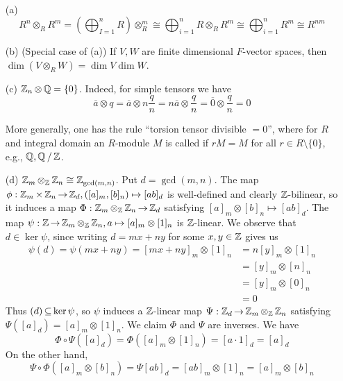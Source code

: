 \documentclass[11pt]{book}
\theoremstyle{definition}   \newtheorem{defn}[counter]{Definition} %
\newcommand{\ov}{\overline}   \newcommand{\wt}{\widetilde}
\newcommand{\bs}{\setminus}   \newcommand{\A}{\mathcal{A}}   \newcommand{\sy}{\textnormal{Syl}}   \newcommand{\size}[1]{\left| #1 \right|}
\DeclareMathOperator{\ra}{\rightarrow}   \DeclareMathOperator{\Poly}{\mathbf{P}}   \DeclareMathOperator{\spn}{\textnormal{span}}   \DeclareMathOperator{\aut}{\textnormal{Aut}}
\newcommand{\vs}{\vspace{8pt}}
\numberwithin{counter}{chapter}
\begin{document}
\vs

\begin{example}\ 
\begin{enumerate}
\item[(a)] \[R^n \otimes_R R^m = \left(\bigoplus_{I=1}^n R\right) \otimes_R^m \cong \bigoplus_{i=1}^n R \otimes_R R^m \cong \bigoplus_{i=1}^n R^m \cong R^{nm} \]

\item[(b)] (Special case of (a)) If $V,W$ are finite dimensional $F$-vector spaces, then $\dim (V \otimes_R W) = \dim V \dim W$. 

\item[(c)] $\operatorname{\mathbb{Z}}_n \otimes \operatorname{\mathbb{Q}} = \{0\}$. Indeed, for simple tensors we have
	\[ \ov{a} \otimes q = \ov{a} \otimes n \frac{q}{n} = n \ov{a} \otimes \frac{q}{n} = \ov{0} \otimes \frac{q}{n} = 0 \]

More generally, one has the rule ``torsion tensor divisible $= 0$'', where for $R$ and integral domain an $R$-module $M$ is called  if $rM = M$ for all $r \in R \bs \{0\}$, e.g., $\operatorname{\mathbb{Q}}, \operatorname{\mathbb{Q}}/\operatorname{\mathbb{Z}}$. 

\item[(d)] $\operatorname{\mathbb{Z}}_m \otimes_{\operatorname{\mathbb{Z}}} \operatorname{\mathbb{Z}}_n \cong \operatorname{\mathbb{Z}}_{\gcd(m,n)}$. Put $d = \gcd(m,n)$. The map $\phi : \z_m \times \z_n \ra \z_d, ([a]_m,[b]_n) \mapsto [ab]_d$ is well-defined and clearly $\operatorname{\mathbb{Z}}$-bilinear, so it induces a map $\Phi : \z_m \otimes_{\z} \z_n \ra \z_d$ satisfying $[a]_m \otimes [b]_n \mapsto [ab]_d$. The map $\psi : \z \ra \z_m \otimes_{\z} \z_n, a \mapsto [a]_m \otimes [1]_n$ is $\operatorname{\mathbb{Z}}$-linear. We observe that $d \in \ker \psi$, since writing $d = mx + ny$ for some $x,y \in \operatorname{\mathbb{Z}}$ gives us
\begin{align*}
\psi(d) = \psi(mx+ny) = [mx+ny]_m \otimes [1]_n &= n[y]_m \otimes [1]_n \\
&= [y]_m \otimes [n]_n \\
&= [y]_m \otimes [0]_n \\
&= 0
\end{align*}
Thus $(d) \operatorname{\subseteq} \ker \psi$, so $\psi$ induces a $\operatorname{\mathbb{Z}}$-linear map $\Psi : \z_d \ra \z_m \otimes_{\z} \z_n$ satisfying $\Psi([a]_d) = [a]_m \otimes [1]_n$. We claim $\Phi$ and $\Psi$ are inverses. We have
	\[\Phi \circ \Psi ([a]_d) = \Phi([a]_m \otimes [1]_n) = [a \cdot 1]_d = [a]_d \]
On the other hand,
	\[\Psi \circ \Phi ([a]_m \otimes [b]_n) = \Psi [ab]_d = [ab]_m \otimes [1]_n = [a]_m \otimes [b]_n \]
\end{enumerate}
\end{example}

\vs
\end{document}
